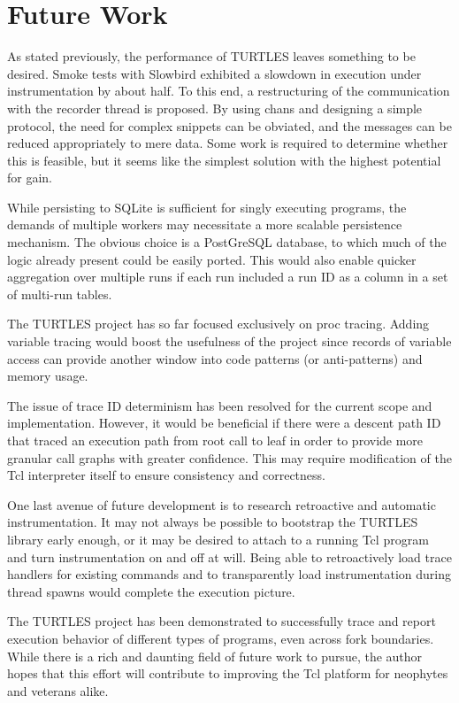 \documentclass{article}[letter,10pt]
\begin{document}
\section{Future Work}{
  As stated previously, the performance of TURTLES leaves something to be desired. Smoke tests with Slowbird exhibited a slowdown
  in execution under instrumentation by about half. To this end, a restructuring of the communication with the recorder thread
  is proposed. By using chans and designing a simple protocol, the need for complex snippets can be obviated, and the messages
  can be reduced appropriately to mere data. Some work is required to determine whether this is feasible, but it seems like the
  simplest solution with the highest potential for gain.

  While persisting to SQLite is sufficient for singly executing programs, the demands of multiple workers may necessitate a
  more scalable persistence mechanism. The obvious choice is a PostGreSQL database, to which much of the logic already present
  could be easily ported. This would also enable quicker aggregation over multiple runs if each run included a run ID as a column
  in a set of multi-run tables.

  The TURTLES project has so far focused exclusively on proc tracing. Adding variable tracing would boost the usefulness of the
  project since records of variable access can provide another window into code patterns (or anti-patterns) and memory usage.

  The issue of trace ID determinism has been resolved for the current scope and implementation. However, it would be beneficial
  if there were a descent path ID that traced an execution path from root call to leaf in order to provide more granular call graphs
  with greater confidence. This may require modification of the Tcl interpreter itself to ensure consistency and correctness.

  One last avenue of future development is to research retroactive and automatic instrumentation. It may not always
  be possible to bootstrap the TURTLES library early enough, or it may be desired to attach to a running Tcl program and
  turn instrumentation on and off at will. Being able to retroactively load trace handlers for
  existing commands and to transparently load instrumentation during thread spawns would complete the execution picture.

  The TURTLES project has been demonstrated to successfully trace and report execution behavior of different types of programs,
  even across fork boundaries. While there is a rich and daunting field of future work to pursue, the author hopes that this
  effort will contribute to improving the Tcl platform for neophytes and veterans alike.
}

\printbibliography
\end{document}
